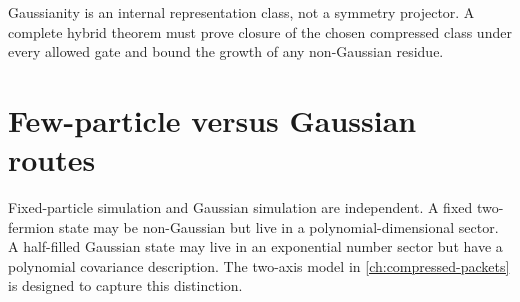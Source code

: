 \begin{frontierbox}
Gaussianity is an internal representation class, not a symmetry projector. A complete hybrid theorem must prove closure of the chosen compressed class under every allowed gate and bound the growth of any non-Gaussian residue.
\end{frontierbox}

\section{Few-particle versus Gaussian routes}
Fixed-particle simulation and Gaussian simulation are independent. A fixed two-fermion state may be non-Gaussian but live in a polynomial-dimensional sector. A half-filled Gaussian state may live in an exponential number sector but have a polynomial covariance description. The two-axis model in \cref{ch:compressed-packets} is designed to capture this distinction.
